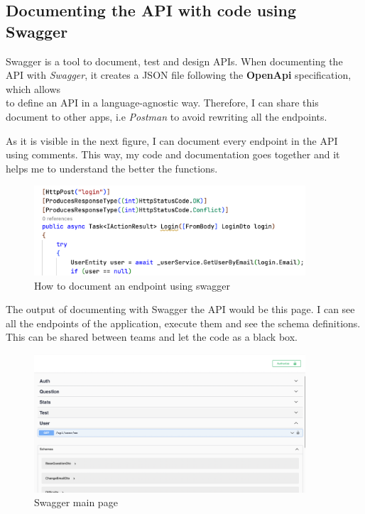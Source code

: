     \subsection{Documenting the API with code using Swagger}
    Swagger \cite{Swagger} is a tool to document, test and design APIs. When documenting the API with \textit{Swagger}, it creates a JSON file following the \textbf{OpenApi} specification, which allows \\
    to define an API in a language-agnostic way. Therefore, I can share this document to other apps, i.e \textit{Postman} to avoid rewriting all the endpoints.

    As it is visible in the next figure, I can document every endpoint in the API using comments. This way, my code and documentation goes together and it helps me to understand the better the functions. \\
    \begin{figure}[H]
        \centering
            \includegraphics[width=0.9\textwidth]{assets/swagger_comment.png}
        \caption{How to document an endpoint using swagger}
        \label{fig:impl_swagger_endpoint}
    \end{figure}

    The output of documenting with Swagger the API would be this page. I can see all the endpoints of the application, execute them and see the schema definitions. This can be shared between teams and let the code as a black box. 
    \begin{figure}[H]
        \centering
            \includegraphics[width=0.9\textwidth]{assets/swagger.png}
        \caption{Swagger main page}
        \label{fig:impl_swagger}
    \end{figure}

